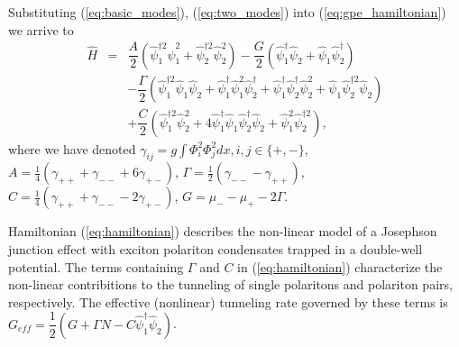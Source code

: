 \documentclass[10pt]{article}
\begin{document}
Substituting (\ref{eq:basic_modes}), (\ref{eq:two_modes}) into (\ref{eq:gpe_hamiltonian}) we arrive to
% 
\begin{equation}
\begin{array}{lcl}
\hat{H} & = & \dfrac{A}{2} (\hat{\psi}_1^{\dag 2} \hat{\psi}_1^2 + \hat{\psi}_2^{\dag 2} \hat{\psi}_2^2) - \dfrac{G}{2} (\hat{\psi}_1^\dag \hat{\psi}_2 + \hat{\psi}_1 \hat{\psi}_2^\dag) \\ [8pt]
& & -\dfrac{\Gamma}{2} (\hat{\psi}_1^{\dag 2} \hat{\psi}_1 \hat{\psi}_2 + \hat{\psi}_1^\dag \hat{\psi}_1^2 \hat{\psi}_2^\dag + \hat{\psi}_1^\dag \hat{\psi}_2^\dag \hat{\psi}_2^2 + \hat{\psi}_1 \hat{\psi}_2^{\dag 2} \hat{\psi}_2) \\ [8pt]
& & +\dfrac{C}{2} (\hat{\psi}_1^{\dag 2} \hat{\psi}_2^2 + 4 \hat{\psi}_1^\dag \hat{\psi}_1 \hat{\psi}_2^\dag \hat{\psi}_2 + \hat{\psi}_1^2 \hat{\psi}_2^{\dag 2}),
\end{array}
\label{eq:hamiltonian}
\end{equation}
%
where we have denoted $\gamma_{ij} = g \int \Phi_i^2 \Phi_j^2 dx, i,j \in \{+,-\}$,
$A = \frac{1}{4} (\gamma_{++} + \gamma_{--} + 6 \gamma_{+-})$, $\Gamma = \frac{1}{2} (\gamma_{--} - \gamma_{++})$, $C = \frac{1}{4} (\gamma_{++} + \gamma_{--} - 2\gamma_{+-})$, $G = \mu_- - \mu_+ - 2\Gamma$.

Hamiltonian (\ref{eq:hamiltonian}) describes the non-linear model of a Josephson junction effect with exciton polariton condensates trapped in a double-well potential.
The terms containing $\Gamma$ and $C$ in (\ref{eq:hamiltonian}) characterize the non-linear contribitions to the tunneling of single polaritons and polariton pairs, respectively.
The effective (nonlinear) tunneling rate governed by these terms is $G_{eff} = \dfrac{1}{2}(G+\Gamma N - C\hat{\psi}_1^\dag\hat{\psi}_2)$.
\end{document}
